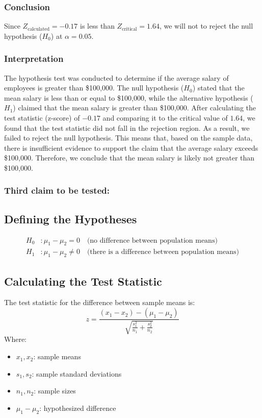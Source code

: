 \documentclass[12pt,a4paper]{article}
\begin{document}
\vspace{1em}
\subsubsection*{Conclusion}
Since $Z_{\text{calculated}} = -0.17$ is less than $Z_{\text{critical}} =  1.64$, we will not to reject the null hypothesis ($H_0$) at $\alpha = 0.05$. 

\vspace{1em}

\subsubsection*{Interpretation} 
The hypothesis test was conducted to determine if the average salary of employees is greater than \$100,000. The null hypothesis (\(H_0\)) stated that the mean salary is less than or equal to \$100,000, while the alternative hypothesis (\(H_1\)) claimed that the mean salary is greater than \$100,000. After calculating the test statistic (z-score) of \( -0.17 \) and comparing it to the critical value of \( 1.64 \), we found that the test statistic did not fall in the rejection region. As a result, we failed to reject the null hypothesis. This means that, based on the sample data, there is insufficient evidence to support the claim that the average salary exceeds \$100,000. Therefore, we conclude that the mean salary is likely not greater than \$100,000.
\newpage


\subsubsection*{Third claim to be tested: }

\subsection*{Defining the Hypotheses}
\begin{align*}
H_0 &: \mu_1 - \mu_2 = 0 \quad \text{(no difference between population means)} \\
H_1 &: \mu_1 - \mu_2 \neq 0 \quad \text{(there is a difference between population means)} 
\end{align*}

\subsection*{Calculating the Test Statistic}
The test statistic for the difference between sample means is:
\[
z = \frac{(x_1 - x_2) - (\mu_1 - \mu_2)}{\sqrt{\frac{s_1^2}{n_1} + \frac{s_2^2}{n_2}}}
\]
Where:
\begin{itemize}
    \item \(x_1, x_2\): sample means
    \item \(s_1, s_2\): sample standard deviations
    \item \(n_1, n_2\): sample sizes
    \item \(\mu_1 - \mu_2\): hypothesized difference 
\end{itemize}
\end{document}
